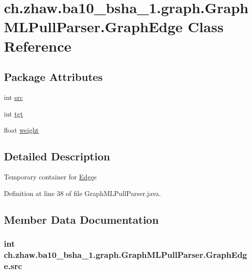 \hypertarget{classch_1_1zhaw_1_1ba10__bsha__1_1_1graph_1_1GraphMLPullParser_1_1GraphEdge}{
\section{ch.zhaw.ba10\_\-bsha\_\-1.graph.GraphMLPullParser.GraphEdge Class Reference}
\label{classch_1_1zhaw_1_1ba10__bsha__1_1_1graph_1_1GraphMLPullParser_1_1GraphEdge}
}
\subsection*{Package Attributes}
\begin{DoxyCompactItemize}
\item 
int \hyperlink{classch_1_1zhaw_1_1ba10__bsha__1_1_1graph_1_1GraphMLPullParser_1_1GraphEdge_a8ddd9c31ff9cbe6303c70fa75c7c7a0f}{src}
\item 
int \hyperlink{classch_1_1zhaw_1_1ba10__bsha__1_1_1graph_1_1GraphMLPullParser_1_1GraphEdge_ab4607327cafc0923bb9b5d0ca34abe1e}{tgt}
\item 
float \hyperlink{classch_1_1zhaw_1_1ba10__bsha__1_1_1graph_1_1GraphMLPullParser_1_1GraphEdge_ab07b6563dfd9148c9097f29edd1e5e03}{weight}
\end{DoxyCompactItemize}


\subsection{Detailed Description}
Temporary container for \hyperlink{classch_1_1zhaw_1_1ba10__bsha__1_1_1graph_1_1Edge}{Edge}s 

Definition at line 38 of file GraphMLPullParser.java.

\subsection{Member Data Documentation}
\hypertarget{classch_1_1zhaw_1_1ba10__bsha__1_1_1graph_1_1GraphMLPullParser_1_1GraphEdge_a8ddd9c31ff9cbe6303c70fa75c7c7a0f}{
\subsubsection[{src}]{\setlength{\rightskip}{0pt plus 5cm}int {\bf ch.zhaw.ba10\_\-bsha\_\-1.graph.GraphMLPullParser.GraphEdge.src}}}
\label{classch_1_1zhaw_1_1ba10__bsha__1_1_1graph_1_1GraphMLPullParser_1_1GraphEdge_a8ddd9c31ff9cbe6303c70fa75c7c7a0f}


